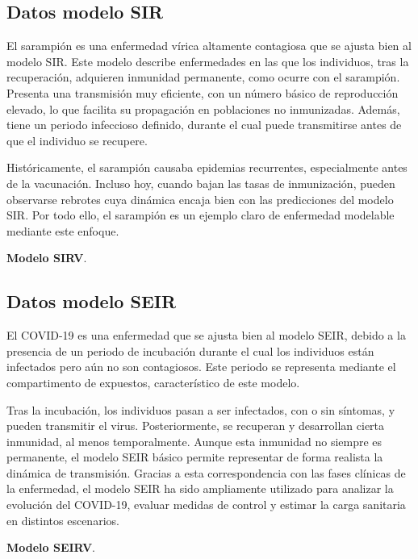 \subsection{Datos modelo SIR}
El sarampión es una enfermedad vírica altamente contagiosa que se ajusta bien al modelo SIR. Este modelo describe enfermedades en las que los individuos, tras la recuperación, adquieren inmunidad permanente, como ocurre con el sarampión.
Presenta una transmisión muy eficiente, con un número básico de reproducción elevado, lo que facilita su propagación en poblaciones no inmunizadas. Además, tiene un periodo infeccioso definido, durante el cual puede transmitirse antes de que el individuo se recupere.

Históricamente, el sarampión causaba epidemias recurrentes, especialmente antes de la vacunación. Incluso hoy, cuando bajan las tasas de inmunización, pueden observarse rebrotes cuya dinámica encaja bien con las predicciones del modelo SIR. Por todo ello, el sarampión es un ejemplo claro de enfermedad modelable mediante este enfoque.



\vspace{2em}
\textbf{Modelo SIRV}. 





\subsection{Datos modelo SEIR}
El COVID-19 es una enfermedad que se ajusta bien al modelo SEIR, debido a la presencia de un periodo de incubación durante el cual los individuos están infectados pero aún no son contagiosos. Este periodo se representa mediante el compartimento de expuestos, característico de este modelo.

Tras la incubación, los individuos pasan a ser infectados, con o sin síntomas, y pueden transmitir el virus. Posteriormente, se recuperan y desarrollan cierta inmunidad, al menos temporalmente. Aunque esta inmunidad no siempre es permanente, el modelo SEIR básico permite representar de forma realista la dinámica de transmisión.
Gracias a esta correspondencia con las fases clínicas de la enfermedad, el modelo SEIR ha sido ampliamente utilizado para analizar la evolución del COVID-19, evaluar medidas de control y estimar la carga sanitaria en distintos escenarios.


\vspace{2em}


\textbf{Modelo SEIRV}. 






